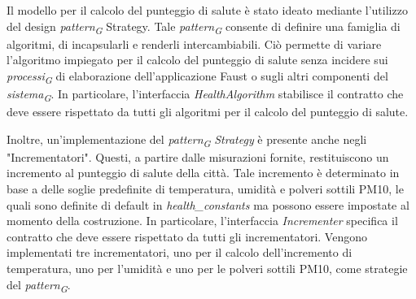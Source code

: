 Il modello per il calcolo del punteggio di salute è stato ideato mediante l'utilizzo del design \textit{pattern}\textsubscript{\textit{G}} Strategy. Tale \textit{pattern}\textsubscript{\textit{G}} consente di definire una famiglia di algoritmi, di incapsularli e renderli intercambiabili. Ciò permette di variare l'algoritmo impiegato per il calcolo del punteggio di salute senza incidere sui \textit{processi}\textsubscript{\textit{G}} di elaborazione dell'applicazione Faust o sugli altri componenti del \textit{sistema}\textsubscript{\textit{G}}. In particolare, l'interfaccia \textit{HealthAlgorithm} stabilisce il contratto che deve essere rispettato da tutti gli algoritmi per il calcolo del punteggio di salute.


Inoltre, un'implementazione del \textit{pattern}\textsubscript{\textit{G}} \textit{Strategy} è presente anche negli "Incrementatori". Questi, a partire dalle misurazioni fornite, restituiscono un incremento al punteggio di salute della città. Tale incremento è determinato in base a delle soglie predefinite di temperatura, umidità e polveri sottili PM10, le quali sono definite di default in \textit{health\_constants} ma possono essere impostate al momento della costruzione. In particolare, l'interfaccia \textit{Incrementer} specifica il contratto che deve essere rispettato da tutti gli incrementatori. Vengono implementati tre incrementatori, uno per il calcolo dell'incremento di temperatura, uno per l'umidità e uno per le polveri sottili PM10, come strategie del \textit{pattern}\textsubscript{\textit{G}}.

